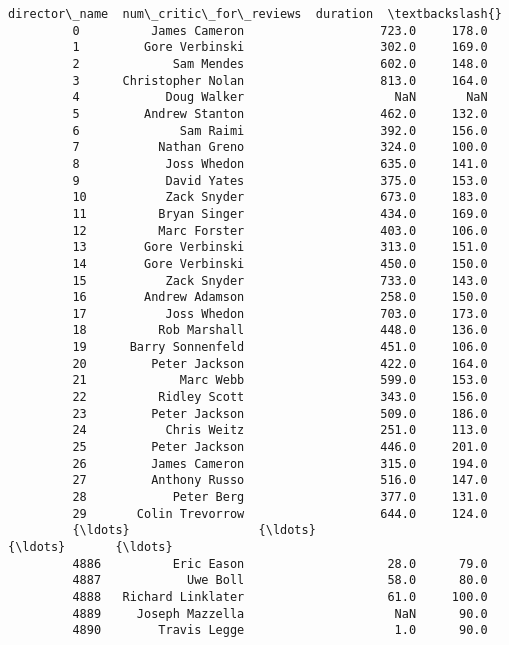 \documentclass[11pt]{article}
\begin{document}
\begin{Verbatim}[commandchars=\\\{\}]
                    director\_name  num\_critic\_for\_reviews  duration  \textbackslash{}
         0          James Cameron                   723.0     178.0   
         1         Gore Verbinski                   302.0     169.0   
         2             Sam Mendes                   602.0     148.0   
         3      Christopher Nolan                   813.0     164.0   
         4            Doug Walker                     NaN       NaN   
         5         Andrew Stanton                   462.0     132.0   
         6              Sam Raimi                   392.0     156.0   
         7           Nathan Greno                   324.0     100.0   
         8            Joss Whedon                   635.0     141.0   
         9            David Yates                   375.0     153.0   
         10           Zack Snyder                   673.0     183.0   
         11          Bryan Singer                   434.0     169.0   
         12          Marc Forster                   403.0     106.0   
         13        Gore Verbinski                   313.0     151.0   
         14        Gore Verbinski                   450.0     150.0   
         15           Zack Snyder                   733.0     143.0   
         16        Andrew Adamson                   258.0     150.0   
         17           Joss Whedon                   703.0     173.0   
         18          Rob Marshall                   448.0     136.0   
         19      Barry Sonnenfeld                   451.0     106.0   
         20         Peter Jackson                   422.0     164.0   
         21             Marc Webb                   599.0     153.0   
         22          Ridley Scott                   343.0     156.0   
         23         Peter Jackson                   509.0     186.0   
         24           Chris Weitz                   251.0     113.0   
         25         Peter Jackson                   446.0     201.0   
         26         James Cameron                   315.0     194.0   
         27         Anthony Russo                   516.0     147.0   
         28            Peter Berg                   377.0     131.0   
         29       Colin Trevorrow                   644.0     124.0   
         {\ldots}                  {\ldots}                     {\ldots}       {\ldots}   
         4886          Eric Eason                    28.0      79.0   
         4887            Uwe Boll                    58.0      80.0   
         4888   Richard Linklater                    61.0     100.0   
         4889     Joseph Mazzella                     NaN      90.0   
         4890        Travis Legge                     1.0      90.0   

\end{Verbatim}
\end{document}
